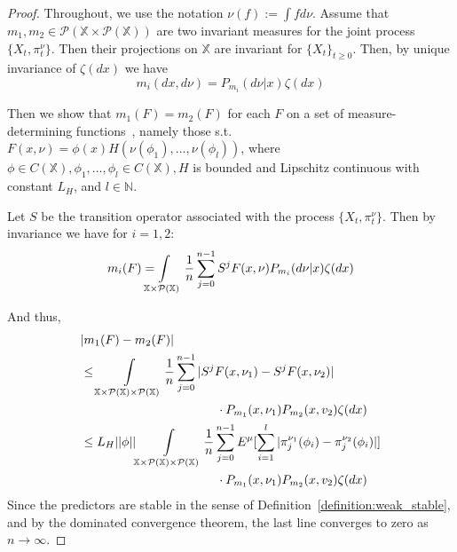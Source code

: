 \documentclass[conference]{IEEEtran}
\begin{document}
\begin{proof}
    Throughout, we use the notation \( \nu(f) := \int fd\nu \). Assume that \( m_1,m_2 \in \mathcal{P}(\mathbb{X} \times \mathcal{P}(\mathbb{X})) \) are two invariant measures for the joint process \( \{X_t,\pi_t^\nu \} \). Then their projections on \( \mathbb{X} \) are invariant for \( \{X_t\}_{t\ge0} \). Then, by unique invariance of \( \zeta(dx) \) we have
    \[ m_i(dx,d\nu) = P_{m_i}(d\nu | x)\zeta(dx) \]

    Then we show that \( m_1(F) = m_2(F) \) for each \( F \) on a set of measure-determining functions~\cite{Stettner}, namely those s.t. \( F(x,\nu) = \phi(x)H(\nu(\phi_1),\ldots,\nu(\phi_l)) \), where \( \phi \in C(\mathbb{X}), \phi_1,\ldots,\phi_l \in C(\mathbb{X}), H \) is bounded and Lipschitz continuous with constant \( L_H \), and \( l \in \mathbb{N} \).

    Let \( S \) be the transition operator associated with the process \( \{X_t,\pi_t^\nu \} \). Then by invariance we have for \( i=1,2 \):
    \[ m_i(F) = \smashoperator[l]{\int\limits_{\mathbb{X} \times \mathcal{P}(\mathbb{X})}} \frac{1}{n}\sum_{j=0}^{n-1}S^j F(x,\nu)P_{m_i}(d\nu | x)\zeta(dx) \]

    And thus,
    \begin{align*}
         & |m_1(F) - m_2(F)|                                                                                                                                                                                                                     \\
         & \le \int\limits_{\mathbb{X} \times \mathcal{P}(\mathbb{X}) \times \mathcal{P}(\mathbb{X})} \frac{1}{n}\sum_{j=0}^{n-1} |S^j F(x,\nu_1) - S^j F(x,\nu_2)|                                                                              \\ & \hspace{11em}\cdot P_{m_1}(x,\nu_1)P_{m_2}(x,v_2)\zeta(dx) \\
         & \le L_H ||\phi|| \quad\quad \smashoperator[l]{\int\limits_{\mathbb{X} \times \mathcal{P}(\mathbb{X}) \times \mathcal{P}(\mathbb{X})}} \frac{1}{n}\sum_{j=0}^{n-1}E^\mu[\sum_{i=1}^{l}|\pi_j^{\nu_1}(\phi_i) - \pi_j^{\nu_2}(\phi_i)|] \\ &\hspace{11em}\cdot P_{m_1}(x,\nu_1)P_{m_2}(x,v_2)\zeta(dx)
    \end{align*}
    Since the predictors are stable in the sense of Definition~\ref{definition:weak_stable}, and by the dominated convergence theorem, the last line converges to zero as \( n \to \infty \).
\end{proof}
\end{document}
